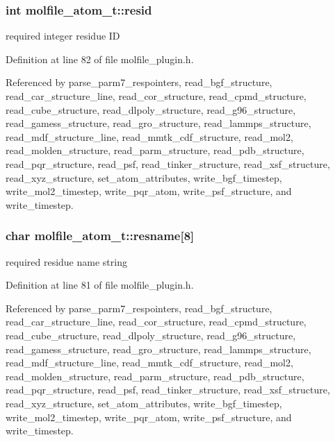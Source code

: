 \subsubsection{\setlength{\rightskip}{0pt plus 5cm}int molfile\_\-atom\_\-t::resid}\label{structmolfile__atom__t_m3}


required integer residue ID 

Definition at line 82 of file molfile\_\-plugin.h.

Referenced by parse\_\-parm7\_\-respointers, read\_\-bgf\_\-structure, read\_\-car\_\-structure\_\-line, read\_\-cor\_\-structure, read\_\-cpmd\_\-structure, read\_\-cube\_\-structure, read\_\-dlpoly\_\-structure, read\_\-g96\_\-structure, read\_\-gamess\_\-structure, read\_\-gro\_\-structure, read\_\-lammps\_\-structure, read\_\-mdf\_\-structure\_\-line, read\_\-mmtk\_\-cdf\_\-structure, read\_\-mol2, read\_\-molden\_\-structure, read\_\-parm\_\-structure, read\_\-pdb\_\-structure, read\_\-pqr\_\-structure, read\_\-psf, read\_\-tinker\_\-structure, read\_\-xsf\_\-structure, read\_\-xyz\_\-structure, set\_\-atom\_\-attributes, write\_\-bgf\_\-timestep, write\_\-mol2\_\-timestep, write\_\-pqr\_\-atom, write\_\-psf\_\-structure, and write\_\-timestep.
\subsubsection{\setlength{\rightskip}{0pt plus 5cm}char molfile\_\-atom\_\-t::resname[8]}\label{structmolfile__atom__t_m2}


required residue name string 

Definition at line 81 of file molfile\_\-plugin.h.

Referenced by parse\_\-parm7\_\-respointers, read\_\-bgf\_\-structure, read\_\-car\_\-structure\_\-line, read\_\-cor\_\-structure, read\_\-cpmd\_\-structure, read\_\-cube\_\-structure, read\_\-dlpoly\_\-structure, read\_\-g96\_\-structure, read\_\-gamess\_\-structure, read\_\-gro\_\-structure, read\_\-lammps\_\-structure, read\_\-mdf\_\-structure\_\-line, read\_\-mmtk\_\-cdf\_\-structure, read\_\-mol2, read\_\-molden\_\-structure, read\_\-parm\_\-structure, read\_\-pdb\_\-structure, read\_\-pqr\_\-structure, read\_\-psf, read\_\-tinker\_\-structure, read\_\-xsf\_\-structure, read\_\-xyz\_\-structure, set\_\-atom\_\-attributes, write\_\-bgf\_\-timestep, write\_\-mol2\_\-timestep, write\_\-pqr\_\-atom, write\_\-psf\_\-structure, and write\_\-timestep.
